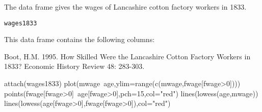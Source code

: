 \begin{Description}\relax
The  data frame gives the wages 
of Lancashire cotton factory workers in 1833.
\end{Description}
\begin{Usage}
\begin{verbatim}wages1833\end{verbatim}
\end{Usage}
\begin{Format}\relax
This data frame contains the following columns:
\end{Format}
\begin{Source}\relax
Boot, H.M. 1995. How Skilled Were the Lancashire Cotton Factory
Workers in 1833? Economic History Review 48: 283-303.
\end{Source}
\begin{Examples}
\begin{ExampleCode}
attach(wages1833)
plot(mwage~age,ylim=range(c(mwage,fwage[fwage>0])))
points(fwage[fwage>0]~age[fwage>0],pch=15,col="red")
lines(lowess(age,mwage))
lines(lowess(age[fwage>0],fwage[fwage>0]),col="red")
\end{ExampleCode}
\end{Examples}

